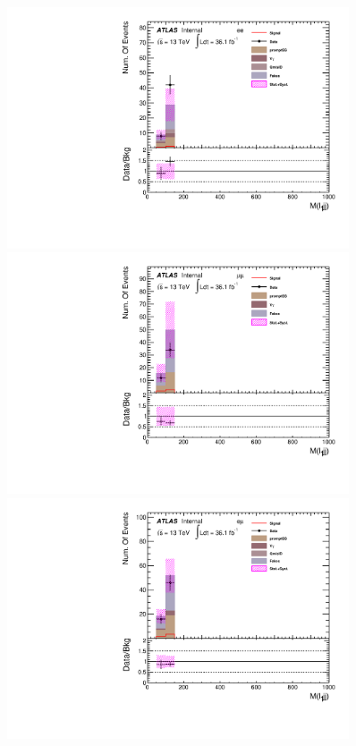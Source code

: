\begin{figure}[h]
\begin{minipage}[t]{0.33\linewidth}
 \centering
 \includegraphics[width=0.9\textwidth,angle=-90]{fig/SigOpt/H300_S135_m_l1jj_ee.pdf}
 \end{minipage}
 \begin{minipage}[t]{0.33\linewidth}
 \centering
 \includegraphics[width=0.9\textwidth,angle=-90]{fig/SigOpt/H300_S135_m_l1jj_mumu.pdf}
 \end{minipage}
 \begin{minipage}[t]{0.33\linewidth}
 \centering
 \includegraphics[width=0.9\textwidth,angle=-90]{fig/SigOpt/H300_S135_m_l1jj_emu.pdf}

\end{minipage}
\end{figure}
